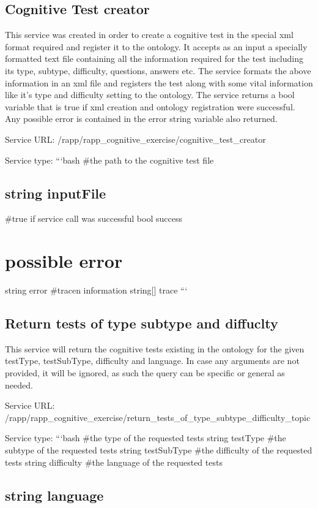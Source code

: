 \subsection*{Cognitive Test creator}

This service was created in order to create a cognitive test in the special xml format required and register it to the ontology. It accepts as an input a specially formatted text file containing all the information required for the test including its type, subtype, difficulty, questions, answers etc. The service formats the above information in an xml file and registers the test along with some vital information like it’s type and difficulty setting to the ontology. The service returns a bool variable that is true if xml creation and ontology registration were successful. Any possible error is contained in the error string variable also returned.

Service U\-R\-L\-: {\ttfamily /rapp/rapp\-\_\-cognitive\-\_\-exercise/cognitive\-\_\-test\-\_\-creator}

Service type\-: ```bash \#the path to the cognitive test file \subsection*{string input\-File }

\#true if service call was successful bool success \section*{possible error}

string error \#tracen information string\mbox{[}\mbox{]} trace ```

\subsection*{Return tests of type subtype and diffuclty}

This service will return the cognitive tests existing in the ontology for the given test\-Type, test\-Sub\-Type, difficulty and language. In case any arguments are not provided, it will be ignored, as such the query can be specific or general as needed.

Service U\-R\-L\-: {\ttfamily /rapp/rapp\-\_\-cognitive\-\_\-exercise/return\-\_\-tests\-\_\-of\-\_\-type\-\_\-subtype\-\_\-difficulty\-\_\-topic}

Service type\-: ```bash \#the type of the requested tests string test\-Type \#the subtype of the requested tests string test\-Sub\-Type \#the difficulty of the requested tests string difficulty \#the language of the requested tests \subsection*{string language }

